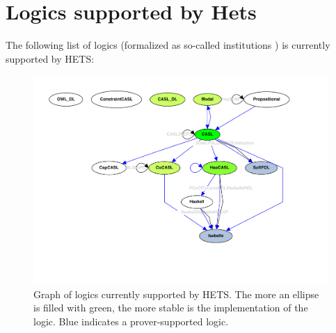 \documentclass{article}
\newcommand{\normalTEXTSC}[2]{{#1\scriptsize#2}}
\newcommand     {\Hets}{\normalTEXTSC{H}{ETS}\xspace}
\begin{document}
\section{Logics supported by Hets}

The following list of logics (formalized as so-called institutions
\cite{GoguenBurstall92}) is currently supported by \Hets:

\begin{figure}
  \begin{center}
    \includegraphics[scale=0.4]{LogicGraph}
  \end{center}
\caption{Graph of logics currently supported by \Hets. The more an 
ellipse is filled with green, the more stable is the implementation of the logic. Blue indicates a prover-supported logic.}
\label{fig:LogicGraph}
\end{figure}
\end{document}
